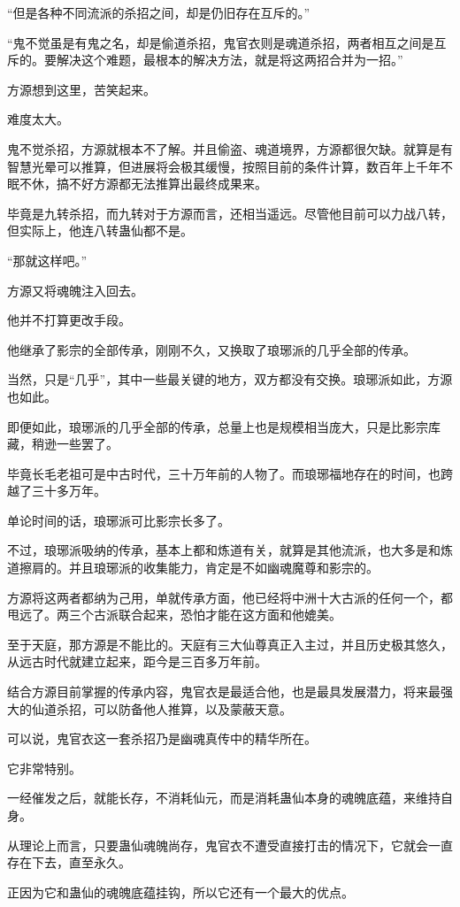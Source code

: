 \begin{this_body}
“但是各种不同流派的杀招之间，却是仍旧存在互斥的。”

“鬼不觉虽是有鬼之名，却是偷道杀招，鬼官衣则是魂道杀招，两者相互之间是互斥的。要解决这个难题，最根本的解决方法，就是将这两招合并为一招。”

方源想到这里，苦笑起来。

难度太大。

鬼不觉杀招，方源就根本不了解。并且偷盗、魂道境界，方源都很欠缺。就算是有智慧光晕可以推算，但进展将会极其缓慢，按照目前的条件计算，数百年上千年不眠不休，搞不好方源都无法推算出最终成果来。

毕竟是九转杀招，而九转对于方源而言，还相当遥远。尽管他目前可以力战八转，但实际上，他连八转蛊仙都不是。

“那就这样吧。”

方源又将魂魄注入回去。

他并不打算更改手段。

他继承了影宗的全部传承，刚刚不久，又换取了琅琊派的几乎全部的传承。

当然，只是“几乎”，其中一些最关键的地方，双方都没有交换。琅琊派如此，方源也如此。

即便如此，琅琊派的几乎全部的传承，总量上也是规模相当庞大，只是比影宗库藏，稍逊一些罢了。

毕竟长毛老祖可是中古时代，三十万年前的人物了。而琅琊福地存在的时间，也跨越了三十多万年。

单论时间的话，琅琊派可比影宗长多了。

不过，琅琊派吸纳的传承，基本上都和炼道有关，就算是其他流派，也大多是和炼道擦肩的。并且琅琊派的收集能力，肯定是不如幽魂魔尊和影宗的。

方源将这两者都纳为己用，单就传承方面，他已经将中洲十大古派的任何一个，都甩远了。两三个古派联合起来，恐怕才能在这方面和他媲美。

至于天庭，那方源是不能比的。天庭有三大仙尊真正入主过，并且历史极其悠久，从远古时代就建立起来，距今是三百多万年前。

结合方源目前掌握的传承内容，鬼官衣是最适合他，也是最具发展潜力，将来最强大的仙道杀招，可以防备他人推算，以及蒙蔽天意。

可以说，鬼官衣这一套杀招乃是幽魂真传中的精华所在。

它非常特别。

一经催发之后，就能长存，不消耗仙元，而是消耗蛊仙本身的魂魄底蕴，来维持自身。

从理论上而言，只要蛊仙魂魄尚存，鬼官衣不遭受直接打击的情况下，它就会一直存在下去，直至永久。

正因为它和蛊仙的魂魄底蕴挂钩，所以它还有一个最大的优点。


\end{this_body}
